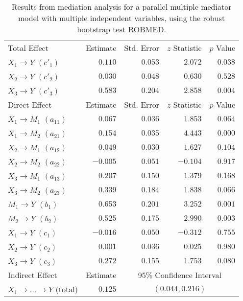 \documentclass{article}\usepackage[]{graphicx}\usepackage[]{xcolor}
\begin{document}
\begin{table}[h!]
\caption{Results from mediation analysis for a parallel multiple mediator model with multiple independent variables, using the robust bootstrap test ROBMED.}
\begin{center}
\begin{tabular}{lrrrr}
\hline\noalign{\smallskip}
Total Effect & Estimate & Std. Error & $z$ Statistic & $p$ Value \\ 
\noalign{\smallskip}\hline\noalign{\smallskip}
$X_{1} \rightarrow Y$ $(c'_{1})$ & $0.110$ & $0.053$ & $2.072$ & $0.038$ \\ 
$X_{2} \rightarrow Y$ $(c'_{2})$ & $0.030$ & $0.048$ & $0.630$ & $0.528$ \\ 
$X_{3} \rightarrow Y$ $(c'_{3})$ & $0.583$ & $0.204$ & $2.858$ & $0.004$ \\ 
\noalign{\smallskip}\hline\noalign{\smallskip}
Direct Effect & Estimate & Std. Error & $z$ Statistic & $p$ Value \\ 
\noalign{\smallskip}\hline\noalign{\smallskip}
$X_{1} \rightarrow M_{1}$ $(a_{11})$ & $0.067$ & $0.036$ & $1.853$ & $0.064$ \\ 
$X_{1} \rightarrow M_{2}$ $(a_{21})$ & $0.154$ & $0.035$ & $4.443$ & $0.000$ \\ 
$X_{2} \rightarrow M_{1}$ $(a_{12})$ & $0.049$ & $0.030$ & $1.627$ & $0.104$ \\ 
$X_{2} \rightarrow M_{2}$ $(a_{22})$ & $-0.005$ & $0.051$ & $-0.104$ & $0.917$ \\ 
$X_{3} \rightarrow M_{1}$ $(a_{13})$ & $0.207$ & $0.150$ & $1.379$ & $0.168$ \\ 
$X_{3} \rightarrow M_{2}$ $(a_{23})$ & $0.339$ & $0.184$ & $1.838$ & $0.066$ \\ 
$M_{1} \rightarrow Y$ $(b_{1})$ & $0.653$ & $0.201$ & $3.252$ & $0.001$ \\ 
$M_{2} \rightarrow Y$ $(b_{2})$ & $0.525$ & $0.175$ & $2.990$ & $0.003$ \\ 
$X_{1} \rightarrow Y$ $(c_{1})$ & $-0.016$ & $0.050$ & $-0.312$ & $0.755$ \\ 
$X_{2} \rightarrow Y$ $(c_{2})$ & $0.001$ & $0.036$ & $0.025$ & $0.980$ \\ 
$X_{3} \rightarrow Y$ $(c_{3})$ & $0.272$ & $0.155$ & $1.753$ & $0.080$ \\ 
\noalign{\smallskip}\hline\noalign{\smallskip}
Indirect Effect & Estimate & \multicolumn{3}{c}{95\% Confidence Interval} \\ 
\noalign{\smallskip}\hline\noalign{\smallskip}
$X_{1} \rightarrow  \ldots  \rightarrow Y$ (total) & $0.125$ & \multicolumn{3}{c}{$(0.044, 0.216)$} \\ 

\end{tabular}
\end{center}
\end{table}
\end{document}
